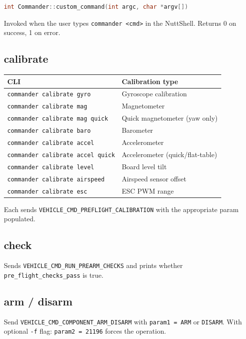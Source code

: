 \documentclass[12pt,a4paper]{article}
\begin{document}
\begin{lstlisting}[language=C++]
int Commander::custom_command(int argc, char *argv[])
\end{lstlisting}

Invoked when the user types \texttt{commander <cmd>} in the NuttShell.
Returns 0 on success, 1 on error.

\subsection{calibrate}

\begin{center}\begin{tabular}{ll}\toprule
CLI & Calibration type \\\midrule
\texttt{commander calibrate gyro} & Gyroscope calibration \\
\texttt{commander calibrate mag} & Magnetometer \\
\texttt{commander calibrate mag quick} & Quick magnetometer (yaw only) \\
\texttt{commander calibrate baro} & Barometer \\
\texttt{commander calibrate accel} & Accelerometer \\
\texttt{commander calibrate accel quick} & Accelerometer (quick/flat-table) \\
\texttt{commander calibrate level} & Board level tilt \\
\texttt{commander calibrate airspeed} & Airspeed sensor offset \\
\texttt{commander calibrate esc} & ESC PWM range \\
\bottomrule\end{tabular}\end{center}

Each sends \texttt{VEHICLE\_CMD\_PREFLIGHT\_CALIBRATION} with the appropriate
param populated.

\subsection{check}
Sends \texttt{VEHICLE\_CMD\_RUN\_PREARM\_CHECKS} and prints whether
\texttt{pre\_flight\_checks\_pass} is true.

\subsection{arm / disarm}
Send \texttt{VEHICLE\_CMD\_COMPONENT\_ARM\_DISARM} with
\texttt{param1 = ARM} or \texttt{DISARM}.
With optional \texttt{-f} flag: \texttt{param2 = 21196} forces the operation.
\end{document}
